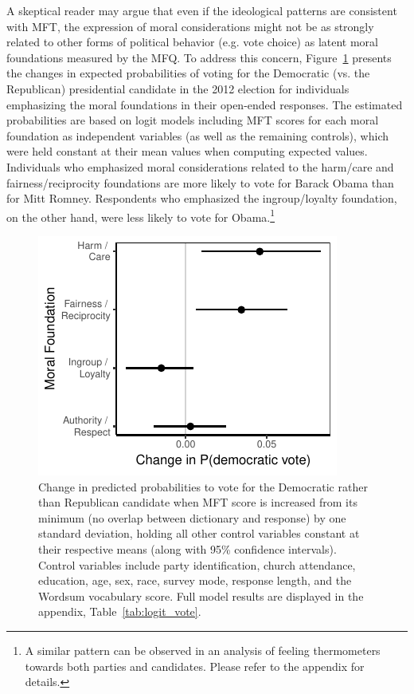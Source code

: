\documentclass[12pt]{article}
\begin{document}
A skeptical reader may argue that even if the ideological patterns are consistent with MFT, the expression of moral considerations might not be as strongly related to other forms of political behavior (e.g. vote choice) as latent moral foundations measured by the MFQ. To address this concern, Figure~\ref{fig:logit_vote} presents the changes in expected probabilities of voting for the Democratic (vs. the Republican) presidential candidate in the 2012 election for individuals emphasizing the moral foundations in their open-ended responses. The estimated probabilities are based on logit models including MFT scores for each moral foundation as independent variables (as well as  the remaining controls), which were held constant at their mean values when computing expected values. Individuals who emphasized moral considerations related to the harm/care and fairness/reciprocity foundations are more likely to vote for Barack Obama than for Mitt Romney. Respondents who emphasized the ingroup/loyalty foundation, on the other hand, were less likely to vote for Obama.\footnote{A similar pattern can be observed in an analysis of feeling thermometers towards both parties and candidates. Please refer to the appendix for details.}

\begin{figure}[ht]\centering
\includegraphics[scale=.9]{../calc/fig/logit_vote.pdf}
\caption{Change in predicted probabilities to vote for the Democratic rather than Republican candidate when MFT score is increased from its minimum (no overlap between dictionary and response) by one standard deviation, holding all other control variables constant at their respective means (along with 95\% confidence intervals). Control variables include party identification, church attendance, education, age, sex, race, survey mode, response length, and the Wordsum vocabulary score. Full model results are displayed in the appendix, Table~\ref{tab:logit_vote}.
}\label{fig:logit_vote}
\end{figure}
\end{document}
